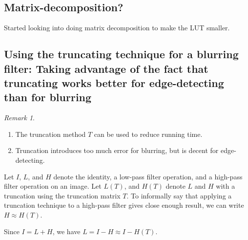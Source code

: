 \documentclass[12pt]{amsart}
\theoremstyle{definition}
\theoremstyle{remark}
\newtheorem{rem}[thm]{Remark}
\numberwithin{thm}{section}
\begin{document}


\subsection{Matrix-decomposition?}
Started looking into doing matrix decomposition to make the LUT smaller.

\subsection{Using the truncating technique for a blurring filter: Taking advantage of the fact that truncating works better for edge-detecting than for blurring}

\begin{rem}\label{rem:sharpening_vs_blurring}
\begin{enumerate}
\item The truncation method $T$ can be used to reduce running time.
\item Truncation introduces too much error for blurring, but is decent for edge-detecting.
\end{enumerate}
\end{rem}

Let $I$, $L$, and $H$ denote the identity, a low-pass filter operation, and a high-pass filter operation on an image.
Let $L(T)$, and $H(T)$ denote $L$ and $H$ with a truncation using the truncation matrix $T$.
To informally say that applying a truncation technique to a high-pass filter gives close enough result, we can write $H \approx H(T)$.

Since $I = L + H$, we have
$L = I - H \approx I - H(T)$.
\end{document}
